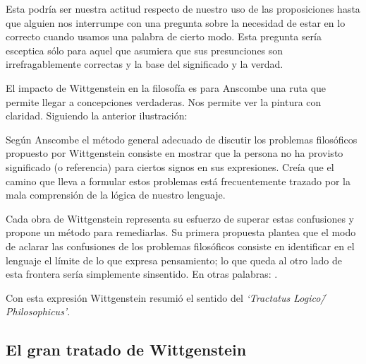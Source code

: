 Esta podría ser nuestra actitud respecto de nuestro uso de las proposiciones
hasta que alguien nos interrumpe con una pregunta sobre la necesidad de estar en
lo correcto cuando usamos una palabra de cierto modo. Esta pregunta sería
esceptica sólo para aquel que asumiera que sus presunciones son
irrefragablemente correctas y la base del significado y la
verdad.\autocite[cfr.~][p.~186]{anscombe2011plato:twocuts}

El impacto de Wittgenstein en la filosofía es para Anscombe una ruta que permite
llegar a concepciones verdaderas. Nos permite ver la pintura con claridad.
Siguiendo la anterior ilustración:


Según Anscombe el método general adecuado de discutir los problemas filosóficos
propuesto por Wittgenstein consiste en mostrar que la persona no ha provisto
significado (o referencia) para ciertos signos en sus expresiones.\autocite[cf.
p. 151]{anscombe1959iwt} Creía que el camino que lleva a formular estos problemas está
frecuentemente trazado por la mala comprensión de la lógica de nuestro lenguaje.

Cada obra de Wittgenstein representa su esfuerzo de superar estas confusiones
y propone un método para remediarlas. Su primera propuesta plantea que el modo
de aclarar las confusiones de los problemas filosóficos consiste en
identificar en el lenguaje el límite de lo que expresa pensamiento; lo que
queda al otro lado de esta frontera sería simplemente sinsentido. En otras
palabras: .
\autocite[prefacio]{wittgenstein1922tractatus}

Con esta expresión Wittgenstein resumió el sentido del \emph{`Tractatus
Logico\=/Philosophicus'}.

\subsection{El gran tratado de Wittgenstein}

